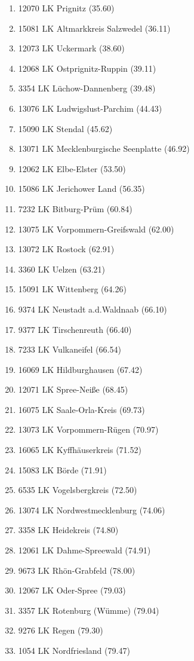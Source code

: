 \begin{enumerate}[itemsep=-6mm]
\item 12070 LK Prignitz (35.60)
\item 15081 LK Altmarkkreis Salzwedel (36.11)
\item 12073 LK Uckermark (38.60)
\item 12068 LK Ostprignitz-Ruppin (39.11)
\item 3354 LK Lüchow-Dannenberg (39.48)
\item 13076 LK Ludwigslust-Parchim (44.43)
\item 15090 LK Stendal (45.62)
\item 13071 LK Mecklenburgische Seenplatte (46.92)
\item 12062 LK Elbe-Elster (53.50)
\item 15086 LK Jerichower Land (56.35)
\item 7232 LK Bitburg-Prüm (60.84)
\item 13075 LK Vorpommern-Greifswald (62.00)
\item 13072 LK Rostock (62.91)
\item 3360 LK Uelzen (63.21)
\item 15091 LK Wittenberg (64.26)
\item 9374 LK Neustadt a.d.Waldnaab (66.10)
\item 9377 LK Tirschenreuth (66.40)
\item 7233 LK Vulkaneifel (66.54)
\item 16069 LK Hildburghausen (67.42)
\item 12071 LK Spree-Neiße (68.45)
\item 16075 LK Saale-Orla-Kreis (69.73)
\item 13073 LK Vorpommern-Rügen (70.97)
\item 16065 LK Kyffhäuserkreis (71.52)
\item 15083 LK Börde (71.91)
\item 6535 LK Vogelsbergkreis (72.50)
\item 13074 LK Nordwestmecklenburg (74.06)
\item 3358 LK Heidekreis (74.80)
\item 12061 LK Dahme-Spreewald (74.91)
\item 9673 LK Rhön-Grabfeld (78.00)
\item 12067 LK Oder-Spree (79.03)
\item 3357 LK Rotenburg (Wümme) (79.04)
\item 9276 LK Regen (79.30)
\item 1054 LK Nordfriesland (79.47)

\end{enumerate}
